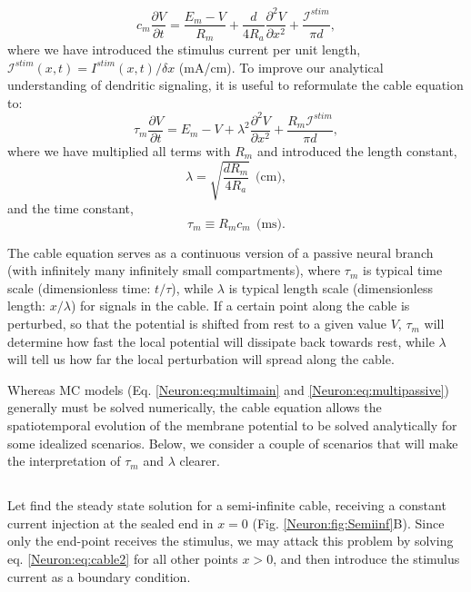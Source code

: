 \begin{equation}
c_m \frac{\partial V}{\partial t} = \frac{E_m-V}{R_m} +  \frac{d}{4 R_a}  \frac{\partial^2 V}{\partial x^2}  + \frac{\mathcal{I}^{stim}}{\pi d},
\label{Neuron:eq:cable}
\end{equation}
where we have  introduced the stimulus current per unit length, $\mathcal{I}^{stim}(x,t) = I^{stim}(x,t)/\delta x$ (mA/cm). To improve our analytical understanding of dendritic signaling, it is useful to reformulate the cable equation to:
\begin{equation}
\tau_m \frac{\partial V}{\partial t} = E_m-V +   \lambda^2  \frac{\partial^2 V}{\partial x^2}  + \frac{R_m \mathcal{I}^{stim} }{\pi d},
\label{Neuron:eq:cable2}
\end{equation}
where we have multiplied all terms with $R_m$ and introduced the length constant,
\begin{equation}
\lambda = \sqrt{\frac{d R_m}{4 R_a}} \,\; \text{(cm)}, 
\label{Neuron:eq:lengthconst}
\end{equation}
and the time constant, 
\begin{equation}
\tau_m \equiv R_m c_m  \,\; \text{(ms)}.
\label{Neuron:eq:timeconst}
\end{equation}

The cable equation serves as a continuous version of a passive neural branch (with infinitely many infinitely small compartments), where $\tau_m$ is typical time scale (dimensionless time: $t/\tau$), while $\lambda$  is typical length scale  (dimensionless length: $x/\lambda$) for signals in the cable. If a certain point along the cable is perturbed, so that the potential is shifted from rest to a given value $V$, $\tau_m$ will determine how fast the local potential will dissipate back towards rest, while $\lambda$ will tell us how far the local perturbation will spread along the cable. 

Whereas MC models (Eq. \ref{Neuron:eq:multimain} and \ref{Neuron:eq:multipassive}) generally must be solved numerically, the cable equation allows the spatiotemporal evolution of the membrane potential to be solved analytically for some idealized scenarios. Below, we consider a couple of scenarios that will  make the interpretation of $\tau_m$ and $\lambda$ clearer. 


\subsection{}
\label{sec:Neuron:cableSS}
Let find the steady state solution for a semi-infinite cable, receiving a constant current injection at the sealed end in $x=0$ (Fig. \ref{Neuron:fig:Semiinf}B). Since only the end-point receives the stimulus, we may attack this problem by solving eq. \ref{Neuron:eq:cable2} for all other points $x>0$, and then introduce the stimulus current as a boundary condition. 

